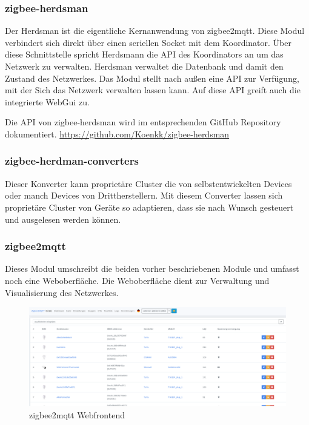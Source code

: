 \subsubsection{zigbee-herdsman}

Der Herdsman ist die eigentliche Kernanwendung von zigbee2mqtt. Diese Modul verbindert sich direkt über einen seriellen Socket mit dem Koordinator. Über diese Schnittstelle
spricht Herdsmann die API des Koordinators an um das Netzwerk zu verwalten. Herdsman verwaltet die Datenbank und damit den Zustand des Netzwerkes. Das Modul stellt nach außen
eine API zur Verfügung, mit der Sich das Netzwerk verwalten lassen kann. Auf diese API greift auch die integrierte WebGui zu.

Die API von zigbee-herdsman wird im entsprechenden GitHub Repository dokumentiert.
\url{https://github.com/Koenkk/zigbee-herdsman}

\subsubsection{zigbee-herdman-converters}

Dieser Konverter kann proprietäre Cluster die von selbstentwickelten Devices oder manch Devices von Drittherstellern. Mit diesem Converter lassen sich proprietäre Cluster von Geräte
so adaptieren, dass sie nach Wunsch gesteuert und ausgelesen werden können.

\subsubsection{zigbee2mqtt}

Dieses Modul umschreibt die beiden vorher beschriebenen Module und umfasst noch eine Weboberfläche. Die Weboberfläche dient zur Verwaltung und Visualisierung des Netzwerkes.
\begin{figure}[H]
  \centering
  \includegraphics[width=1\textwidth]{media/z2m.png}
  \caption{zigbee2mqtt Webfrontend}
\end{figure}

